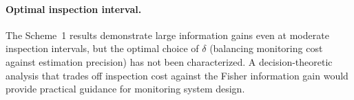 \documentclass[12pt]{article}
\theoremstyle{definition}
\theoremstyle{remark}
\begin{document}
\paragraph{Optimal inspection interval.}
The Scheme~1 results demonstrate large information gains even at
moderate inspection intervals, but the optimal choice of $\delta$
(balancing monitoring cost against estimation precision) has not
been characterized.  A decision-theoretic analysis that trades off
inspection cost against the Fisher information gain would provide
practical guidance for monitoring system design.





\end{document}
